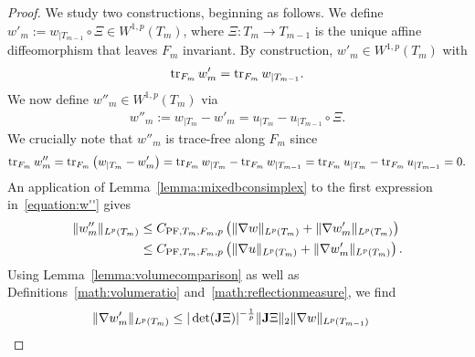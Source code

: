 \documentclass[10pt,a4paper]{article}
\begin{document}
\begin{proof}
    We study two constructions, beginning as follows. 
    We define $w'_{m} := w_{|T_{m-1}} \circ \Xi \in W^{1,p}(T_{m})$,
    where $\Xi : T_{m} \rightarrow T_{m-1}$ is the unique affine diffeomorphism that leaves $F_{m}$ invariant. 
    By construction, $w'_{m} \in W^{1,p}(T_{m})$ with 
    \begin{align*}
        \operatorname{tr}_{F_{m}} w'_{m} = \operatorname{tr}_{F_{m}} w_{|T_{m-1}}
        .
    \end{align*}
    We now define $w''_{m} \in W^{1,p}(T_{m})$ via 
    \begin{align}\label{equation:w''}
        w''_{m} 
        := 
        w_{|T_{m}} - w'_{m} = u_{|T_{m}} - u_{|T_{m-1}} \circ \Xi.
    \end{align}
    We crucially note that $w''_{m}$ is trace-free along $F_{m}$ since
    \begin{align*}
        \operatorname{tr}_{F_{m}} w''_{m} 
        = 
        \operatorname{tr}_{F_{m}} \left( 
            w_{|T_{m}} - w'_{m} 
        \right) 
        =
        \operatorname{tr}_{F_{m}} w_{|T_{m}}
        -
        \operatorname{tr}_{F_{m}} w_{|T_{m-1}}
        =
        \operatorname{tr}_{F_{m}} u_{|T_{m}}
        -
        \operatorname{tr}_{F_{m}} u_{|T_{m-1}}
        = 0.
    \end{align*}
    An application of Lemma~\ref{lemma:mixedbconsimplex} to the first expression in~\eqref{equation:w''} gives 
    \begin{align*}
        \| w''_{m} \|_{L^{p}(T_{m})} 
        &
        \leq 
        C_{{\rm PF},T_{m},F_{m},p} 
        \left( 
            \| \nabla w \|_{L^{p}(T_{m})} 
            + 
            \| \nabla w'_{m} \|_{L^{p}(T_{m})} 
        \right) 
        \\&
        \leq 
        C_{{\rm PF},T_{m},F_{m},p} 
        \left( 
            \| \nabla u \|_{L^{p}(T_{m})} 
            + 
            \| \nabla w'_{m} \|_{L^{p}(T_{m})} 
        \right) 
        .
    \end{align*}
    Using Lemma~\ref{lemma:volumecomparison} as well as Definitions~\eqref{math:volumeratio} and~\eqref{math:reflectionmeasure}, we find 
    \begin{align*}
        \| \nabla w'_{m} \|_{L^{p}(T_{m})}
        &
        \leq 
        |\det(\Jacobian \Xi  )|^{-\frac 1 p} 
        \matnorm{ \Jacobian \Xi }
        \| \nabla w \|_{L^{p}(T_{m-1})}

\end{align*}
\end{proof}
\end{document}
